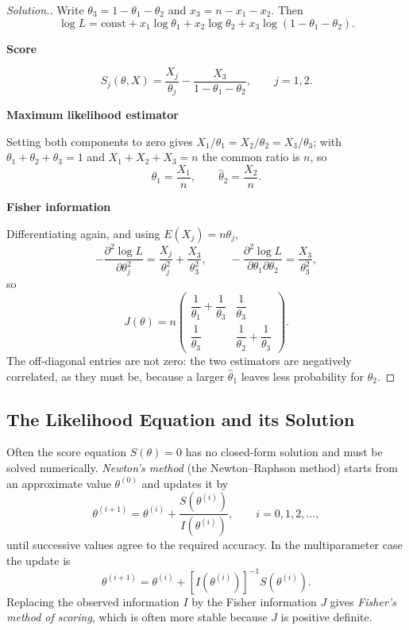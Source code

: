 \documentclass[12pt,a4paper]{report}
\theoremstyle{definition}
\newcommand{\subhead}[1]{%
  \par\medskip\noindent\textbf{#1}\par\nobreak\smallskip}
\newenvironment{solution}
  {\renewcommand{\qedsymbol}{}\begin{proof}[\textit{Solution}.]}
  {\end{proof}}
\begin{document}
\begin{solution}
Write $\theta_3 = 1-\theta_1-\theta_2$ and $x_3 = n-x_1-x_2$. Then
\[\log L = \text{const} + x_1\log\theta_1 + x_2\log\theta_2 + x_3\log\left(1-\theta_1-\theta_2\right).\]

\subhead{Score}
\[S_j(\theta,X) = \frac{X_j}{\theta_j} - \frac{X_3}{1-\theta_1-\theta_2},
\qquad j=1,2 .\]

\subhead{Maximum likelihood estimator}
Setting both components to zero gives
$X_1/\theta_1 = X_2/\theta_2 = X_3/\theta_3$; with
$\theta_1+\theta_2+\theta_3=1$ and $X_1+X_2+X_3=n$ the common ratio is $n$, so
\[\widehat{\theta}_1 = \frac{X_1}{n},\qquad \widehat{\theta}_2 = \frac{X_2}{n} .\]

\subhead{Fisher information}
Differentiating again, and using $E(X_j)=n\theta_j$,
\[-\frac{\partial^{2}\log L}{\partial\theta_j^{2}} = \frac{X_j}{\theta_j^{2}} + \frac{X_3}{\theta_3^{2}},
\qquad
-\frac{\partial^{2}\log L}{\partial\theta_1\partial\theta_2} = \frac{X_3}{\theta_3^{2}},\]
so
\[J(\theta) = n\begin{pmatrix}
\dfrac{1}{\theta_1}+\dfrac{1}{\theta_3} & \dfrac{1}{\theta_3}\\[8pt]
\dfrac{1}{\theta_3} & \dfrac{1}{\theta_2}+\dfrac{1}{\theta_3}
\end{pmatrix}.\]
The off-diagonal entries are not zero: the two estimators are negatively
correlated, as they must be, because a larger $\widehat{\theta}_1$ leaves less
probability for $\theta_2$.
\end{solution}

\subsection{The Likelihood Equation and its Solution}

Often the score equation $S(\theta) = 0$ has no closed-form solution and must be
solved numerically. \emph{Newton's method} (the Newton--Raphson method) starts from
an approximate value $\theta^{(0)}$ and updates it by
\begin{equation}
\label{eq:newton}
\theta^{(i + 1)} = \theta^{(i)} + \frac{S\left(\theta^{(i)}\right)}{I\left(\theta^{(i)}\right)},\qquad i = 0, 1, 2, \dots ,
\end{equation}
until successive values agree to the required accuracy. In the multiparameter case
the update is
\[\theta^{(i + 1)} = \theta^{(i)} + \left[I\left(\theta^{(i)}\right)\right]^{-1}S\left(\theta^{(i)}\right).\]
Replacing the observed information $I$ by the Fisher information $J$ gives
\emph{Fisher's method of scoring}, which is often more stable because $J$ is
positive definite.
\end{document}
